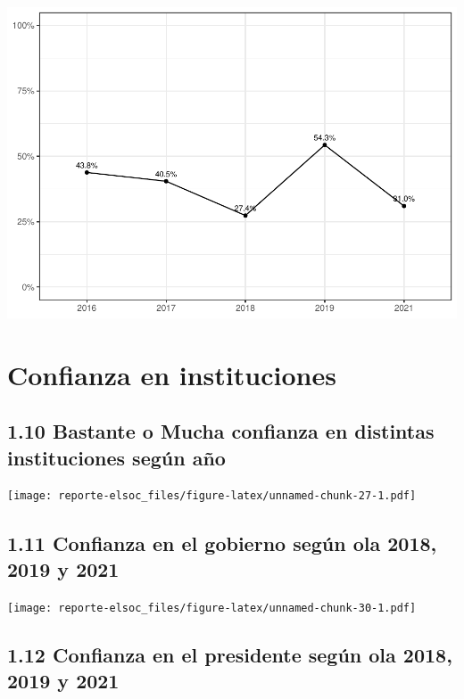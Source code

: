 \documentclass[
  12pt,
  openany]{book}
\begin{document}
\includegraphics{reporte-elsoc_files/figure-latex/unnamed-chunk-24-1.pdf}

\hypertarget{confianza-en-instituciones}{%
\section{Confianza en instituciones}\label{confianza-en-instituciones}}

\hypertarget{bastante-o-mucha-confianza-en-distintas-instituciones-seguxfan-auxf1o}{%
\subsection{1.10 Bastante o Mucha confianza en distintas instituciones según año}\label{bastante-o-mucha-confianza-en-distintas-instituciones-seguxfan-auxf1o}}

\texttt{[image: reporte-elsoc\_files/figure-latex/unnamed-chunk-27-1.pdf]}

\hypertarget{confianza-en-el-gobierno-seguxfan-ola-2018-2019-y-2021}{%
\subsection{1.11 Confianza en el gobierno según ola 2018, 2019 y 2021}\label{confianza-en-el-gobierno-seguxfan-ola-2018-2019-y-2021}}

\texttt{[image: reporte-elsoc\_files/figure-latex/unnamed-chunk-30-1.pdf]}

\hypertarget{confianza-en-el-presidente-seguxfan-ola-2018-2019-y-2021}{%
\subsection{1.12 Confianza en el presidente según ola 2018, 2019 y 2021}\label{confianza-en-el-presidente-seguxfan-ola-2018-2019-y-2021}}
\end{document}
